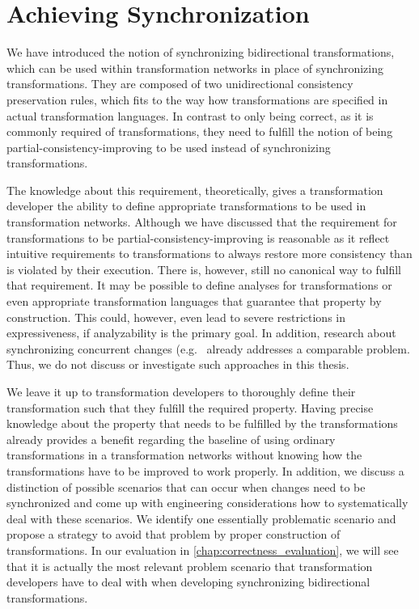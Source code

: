 \section{Achieving Synchronization} %
\label{chap:synchronization:achieving}

We have introduced the notion of synchronizing bidirectional transformations, which can be used within transformation networks in place of synchronizing transformations.
They are composed of two unidirectional consistency preservation rules, which fits to the way how transformations are specified in actual transformation languages.
In contrast to only being correct, as it is commonly required of transformations, they need to fulfill the notion of being partial-consistency-improving to be used instead of synchronizing transformations.

The knowledge about this requirement, theoretically, gives a transformation developer the ability to define appropriate transformations to be used in transformation networks.
Although we have discussed that the requirement for transformations to be partial-consistency-improving is reasonable as it reflect intuitive requirements to transformations to always restore more consistency than is violated by their execution.
There is, however, still no canonical way to fulfill that requirement.
It may be possible to define analyses for transformations or even appropriate transformation languages that guarantee that property by construction.
This could, however, even lead to severe restrictions in expressiveness, if analyzability is the primary goal.
In addition, research about synchronizing concurrent changes (e.g.~\cite{hermann2012concurrentSynchronization-FASE,orejas2020IncrementalConcurrentSynchronization-FASE,xiong2013SynchronizingConcurrentUpdates-SoSym,xiong2009parallelUpdates-ICMT} already addresses a comparable problem.
Thus, we do not discuss or investigate such approaches in this thesis.

We leave it up to transformation developers to thoroughly define their transformation such that they fulfill the required property.
Having precise knowledge about the property that needs to be fulfilled by the transformations already provides a benefit regarding the baseline of using ordinary transformations in a transformation networks without knowing how the transformations have to be improved to work properly.
In addition, we discuss a distinction of possible scenarios that can occur when changes need to be synchronized and come up with engineering considerations how to systematically deal with these scenarios.
We identify one essentially problematic scenario and propose a strategy to avoid that problem by proper construction of transformations.
In our evaluation in \autoref{chap:correctness_evaluation}, we will see that it is actually the most relevant problem scenario that transformation developers have to deal with when developing synchronizing bidirectional transformations.

